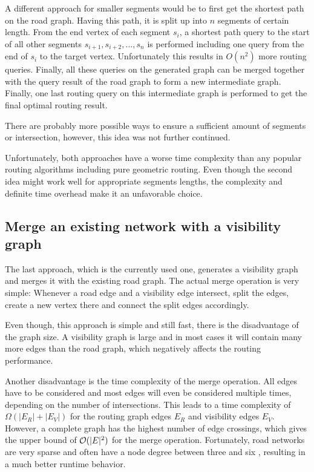 		A different approach for smaller segments would be to first get the shortest path on the road graph.
		Having this path, it is split up into $n$ segments of certain length.
		From the end vertex of each segment $s_i$, a shortest path query to the start of all other segments $s_{i+1}, s_{i+2}, ..., s_n$ is performed including one query from the end of $s_i$ to the target vertex.
		Unfortunately this results in $O(n^2)$ more routing queries.
		Finally, all these queries on the generated graph can be merged together with the query result of the road graph to form a new intermediate graph.
		Finally, one last routing query on this intermediate graph is performed to get the final optimal routing result.
		
		There are probably more possible ways to ensure a sufficient amount of segments or intersection, however, this idea was not further continued.
		
		Unfortunately, both approaches have a worse time complexity than any popular routing algorithms including pure geometric routing.
		Even though the second idea might work well for appropriate segments lengths, the complexity and definite time overhead make it an unfavorable choice.
	
	\subsection{Merge an existing network with a visibility graph}
	
		The last approach, which is the currently used one, generates a visibility graph and merges it with the existing road graph.
		The actual merge operation is very simple:
		Whenever a road edge and a visibility edge intersect, split the edges, create a new vertex there and connect the split edges accordingly.
		
		Even though, this approach is simple and still fast, there is the disadvantage of the graph size.
		A visibility graph is large and in most cases it will contain many more edges than the road graph, which negatively affects the routing performance.
		
		Another disadvantage is the time complexity of the merge operation.
		All edges have to be considered and most edges will even be considered multiple times, depending on the number of intersections.
		This leads to a time complexity of $\Omega(|E_R| + |E_V|)$ for the routing graph edges $E_R$ and visibility edges $E_V$.
		However, a complete graph has the highest number of edge crossings, which gives the upper bound of $\mathcal{O}(|E|^2)$ for the merge operation.
		Fortunately, road networks are very sparse and often have a node degree between three and six \cite{zhao-analysis-osm-bejing}\cite{boeing-osmnx}, resulting in a much better runtime behavior.
		
